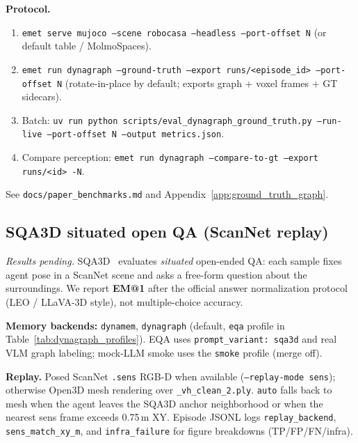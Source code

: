 \textbf{Protocol.}
\begin{enumerate}
  \item \texttt{emet serve mujoco --scene robocasa --headless --port-offset N} (or default table / MolmoSpaces).
  \item \texttt{emet run dynagraph --ground-truth --export runs/<episode\_id> --port-offset N} (rotate-in-place by default; exports graph + voxel frames + GT sidecars).
  \item Batch: \texttt{uv run python scripts/eval\_dynagraph\_ground\_truth.py --run-live --port-offset N --output metrics.json}.
  \item Compare perception: \texttt{emet run dynagraph --compare-to-gt --export runs/<id> -N}.
\end{enumerate}

See \texttt{docs/paper\_benchmarks.md} and Appendix~\ref{app:ground_truth_graph}.

\subsection{SQA3D situated open QA (ScanNet replay)}
\label{sec:sqa3d_benchmark}

\textit{Results pending.}
SQA3D~\cite{sqa3d2023} evaluates \emph{situated} open-ended QA: each sample fixes agent pose in a ScanNet scene and asks a free-form question about the surroundings.
We report \textbf{EM@1} after the official answer normalization protocol (LEO / LLaVA-3D style), not multiple-choice accuracy.

\textbf{Memory backends:} \texttt{dynamem}, \texttt{dynagraph} (default, \texttt{eqa} profile in Table~\ref{tab:dynagraph_profiles}).
EQA uses \texttt{prompt\_variant: sqa3d} and real VLM graph labeling; mock-LLM smoke uses the \texttt{smoke} profile (merge off).

\textbf{Replay.}
Posed ScanNet \texttt{.sens} RGB-D when available (\texttt{--replay-mode sens}); otherwise Open3D mesh rendering over \texttt{\_vh\_clean\_2.ply}.
\texttt{auto} falls back to mesh when the agent leaves the SQA3D anchor neighborhood or when the nearest sens frame exceeds 0.75\,m XY.
Episode JSONL logs \texttt{replay\_backend}, \texttt{sens\_match\_xy\_m}, and \texttt{infra\_failure} for figure breakdowns (TP/FP/FN/infra).

